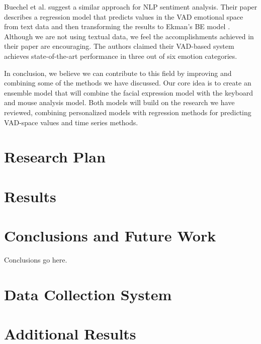\documentclass{article}
\begin{document}
Buechel et al. \cite{emotion_regression} suggest a similar approach for NLP sentiment analysis. 
Their paper describes a regression model that predicts values in the VAD emotional 
space \cite{VAD_model} from text data and then transforming the results to Ekman's BE model \cite{Ekman_Theory}. 
Although we are not using textual data, we feel the accomplishments achieved in their 
paper are encouraging. The authors claimed their VAD-based system achieves state-of-the-art 
performance in three out of six emotion categories.
\par

In conclusion, we believe we can contribute to this field by improving and combining some of the 
methods we have discussed. Our core idea is to create an ensemble model that will combine the 
facial expression model with the keyboard and mouse analysis model. 
Both models will build on the research we have reviewed, combining personalized models with 
regression methods for predicting VAD-space values and time series methods.

\newpage

\section{Research Plan}


\newpage

\section{Results}


\section{Conclusions and Future Work}
Conclusions go here.

\newpage




\newpage

\begin{appendices}
  \section{Data Collection System}
  
  
  \section{Additional Results}
  
\end{appendices}
\end{document}

